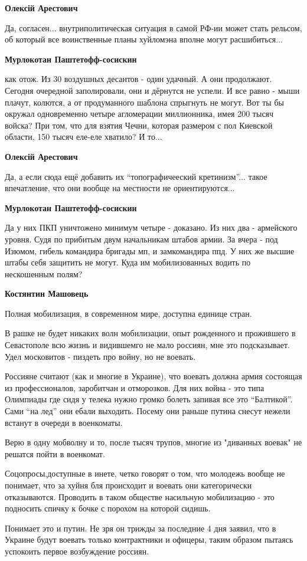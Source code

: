 \begin{itemize}
\begin{itemize}
\textbf{Олексій Арестович} 

Да, согласен... внутриполитическая ситуация в самой РФ-ии может стать рельсом,
об который все воинственные планы хуйломэна вполне могут расшибиться...

\textbf{Мурлокотан Паштетофф-сосискин} 

\obeycr
как отож.
Из 30 воздушных десантов - один удачный.
А они продолжают.
Сегодня очередной заполировали, они и дёрнутся не успели.
И все равно - мыши плачут, колются, а от продуманного шаблона спрыгнуть не могут.
Вот ты бы окружал одновременно четыре агломерации миллионника, имея 200 тысяч войска?
При том, что для взятия Чечни, которая размером с пол Киевской области, 150 тысяч еле-еле хватило? И то...
\restorecr

\textbf{Олексій Арестович} 

Да, а если сюда ещё добавить их \enquote{топографичееский кретинизм}... такое
впечатление, что они вообще на местности не ориентируются...

\textbf{Мурлокотан Паштетофф-сосискин}

\obeycr
Да у них ПКП уничтожено минимум четыре - доказано.
Из них два - армейского уровня. Судя по прибитым двум начальникам штабов армии.
За вчера - под Изюмом, гибель командира бригады мп, и замкомандира ппд.
У них же высшие штабы себя защитить не могут.
Куда им мобилизованных водить по нескошенным полям?
\restorecr

\textbf{Костянтин Машовець} 

Полная мобилизация, в современном мире, доступна единице стран.

В рашке не будет никаких волн мобилизации, опыт рожденного и прожившего в
Севастополе всю жизнь и видившемго не мало россиян, мне это подсказывает. Удел
московитов - пиздеть про войну, но не воевать.

Россияне считают (как и многие в Украине), что воевать должна армия состоящая из
профессионалов, заробитчан и отморозков. Для них война - это типа Олимпиады где
сидя у телека нужно громко болеть запивая все это \enquote{Балтикой}. Сами \enquote{на лед} они
ебали выходить. Посему они раньше путина снесут нежели встанут в очереди в
военкоматы.

Верю в одну мобволну и то, после тысяч трупов, многие из "диванных воевак" не решатся пойти в военкомат.

Соцопросы,доступные в инете, четко говорят о том, что молодежь вообще не
понимает, что за хуйня бля происходит и воевать они категорически отказываются.
Проводить в таком обществе насильную мобилизацию - это подносить спичку к бочке
с порохом на которой сидишь.

Понимает это и путин. Не зря он трижды за последние 4 дня заявил, что в Украине будут воевать только контрактники и офицеры, таким образом пытаясь успокоить первое возбуждение россиян.


\end{itemize} %

\end{itemize} %
